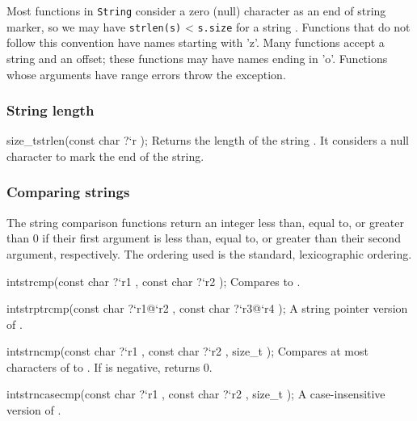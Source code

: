 Most functions in \texttt{String} consider a zero (null) character as
an end of string marker, so we may have \texttt{strlen(s)} <
\texttt{s.size} for a string .  Functions that do not follow
this convention have names starting with 'z'.  Many functions accept a
string and an offset; these functions may have names ending in 'o'.
Functions whose arguments have range errors throw the
 exception.

\subsubsection*{String length}
\begin{defun2}{size_t}{strlen}{(const char {?}`r );}
  Returns the length of the string .  It considers a null
  character to mark the end of the string.
\end{defun2}

\subsubsection*{Comparing strings}
The string comparison functions return an integer less than, equal to,
or greater than 0 if their first argument is less than, equal to, or
greater than their second argument, respectively.  The ordering used
is the standard, lexicographic ordering.

\begin{defun2}{int}{strcmp}{(const char {?}`r1 , const char {?}`r2 );}
  Compares  to .
\end{defun2}

\begin{defun2}{int}{strptrcmp}{(const char {?}`r1@`r2 , const char {?}`r3@`r4 );}
  A string pointer version of .
\end{defun2}

\begin{defun2}{int}{strncmp}{(const char {?}`r1 , const char {?}`r2 , size_t );}
  Compares at most  characters of  to .  If
   is negative,  returns 0.
\end{defun2}

\begin{defun2}{int}{strncasecmp}{(const char {?}`r1 , const char {?}`r2 , size_t );}
  A case-insensitive version of .
\end{defun2}

